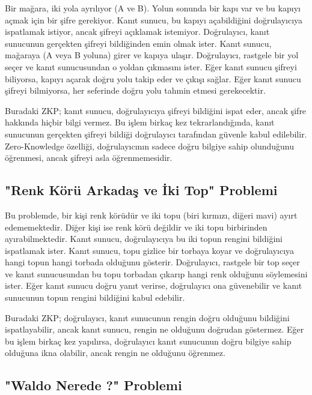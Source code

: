Bir mağara, iki yola ayrılıyor (A ve B). Yolun sonunda bir kapı var ve bu kapıyı açmak için bir şifre gerekiyor. Kanıt sunucu, bu kapıyı açabildiğini doğrulayıcıya ispatlamak istiyor, ancak şifreyi açıklamak istemiyor. Doğrulayıcı, kanıt sunucunun gerçekten şifreyi bildiğinden emin olmak ister. Kanıt sunucu, mağaraya (A veya B yoluna) girer ve kapıya ulaşır. Doğrulayıcı, rastgele bir yol seçer ve kanıt sunucusundan o yoldan çıkmasını ister. Eğer kanıt sunucu şifreyi biliyorsa, kapıyı açarak doğru yolu takip eder ve çıkışı sağlar. Eğer kanıt sunucu şifreyi bilmiyorsa, her seferinde doğru yolu tahmin etmesi gerekecektir.

Buradaki ZKP; kanıt sunucu, doğrulayıcıya şifreyi bildiğini ispat eder, ancak şifre hakkında hiçbir bilgi vermez. Bu işlem birkaç kez tekrarlandığında, kanıt sunucunun gerçekten şifreyi bildiği doğrulayıcı tarafından güvenle kabul edilebilir. Zero-Knowledge özelliği, doğrulayıcının sadece doğru bilgiye sahip olunduğunu öğrenmesi, ancak şifreyi asla öğrenmemesidir.

\newpage

\subsection{"Renk Körü Arkadaş ve İki Top" Problemi}

Bu problemde, bir kişi renk körüdür ve iki topu (biri kırmızı, diğeri mavi) ayırt edememektedir. Diğer kişi ise renk körü değildir ve iki topu birbirinden ayırabilmektedir. Kanıt sunucu, doğrulayıcıya bu iki topun rengini bildiğini ispatlamak ister. Kanıt sunucu, topu gizlice bir torbaya koyar ve doğrulayıcıya hangi topun hangi torbada olduğunu gösterir. Doğrulayıcı, rastgele bir top seçer ve kanıt sunucusundan bu topu torbadan çıkarıp hangi renk olduğunu söylemesini ister. Eğer kanıt sunucu doğru yanıt verirse, doğrulayıcı ona güvenebilir ve kanıt sunucunun topun rengini bildiğini kabul edebilir.

Buradaki ZKP; doğrulayıcı, kanıt sunucunun rengin doğru olduğunu bildiğini ispatlayabilir, ancak kanıt sunucu, rengin ne olduğunu doğrudan göstermez. Eğer bu işlem birkaç kez yapılırsa, doğrulayıcı kanıt sunucunun doğru bilgiye sahip olduğuna ikna olabilir, ancak rengin ne olduğunu öğrenmez.

\newpage

\subsection{"Waldo Nerede ?" Problemi}

